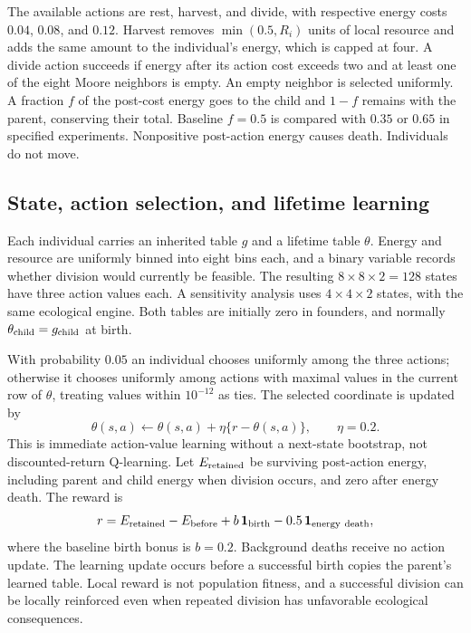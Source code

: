 \documentclass[11pt]{article}
\begin{document}
The available actions are rest, harvest, and divide, with respective energy costs $0.04$, $0.08$, and $0.12$. Harvest removes $\min(0.5,R_i)$ units of local resource and adds the same amount to the individual's energy, which is capped at four. A divide action succeeds if energy after its action cost exceeds two and at least one of the eight Moore neighbors is empty. An empty neighbor is selected uniformly. A fraction $f$ of the post-cost energy goes to the child and $1-f$ remains with the parent, conserving their total. Baseline $f=0.5$ is compared with $0.35$ or $0.65$ in specified experiments. Nonpositive post-action energy causes death. Individuals do not move.

\subsection{State, action selection, and lifetime learning}
Each individual carries an inherited table $g$ and a lifetime table $\theta$. Energy and resource are uniformly binned into eight bins each, and a binary variable records whether division would currently be feasible. The resulting $8\times8\times2=128$ states have three action values each. A sensitivity analysis uses $4\times4\times2$ states, with the same ecological engine. Both tables are initially zero in founders, and normally $\theta_{\rm child}=g_{\rm child}$ at birth.

With probability $0.05$ an individual chooses uniformly among the three actions; otherwise it chooses uniformly among actions with maximal values in the current row of $\theta$, treating values within $10^{-12}$ as ties. The selected coordinate is updated by
\begin{equation}
\theta(s,a)\leftarrow\theta(s,a)+\eta\{r-\theta(s,a)\},\qquad \eta=0.2.
\end{equation}
This is immediate action-value learning without a next-state bootstrap, not discounted-return Q-learning. Let $E_{\rm retained}$ be surviving post-action energy, including parent and child energy when division occurs, and zero after energy death. The reward is
\begin{equation}
r=E_{\rm retained}-E_{\rm before}+b\,\mathbf1_{\rm birth}-0.5\,\mathbf1_{\rm energy\ death},
\end{equation}
where the baseline birth bonus is $b=0.2$. Background deaths receive no action update. The learning update occurs before a successful birth copies the parent's learned table. Local reward is not population fitness, and a successful division can be locally reinforced even when repeated division has unfavorable ecological consequences.
\end{document}
